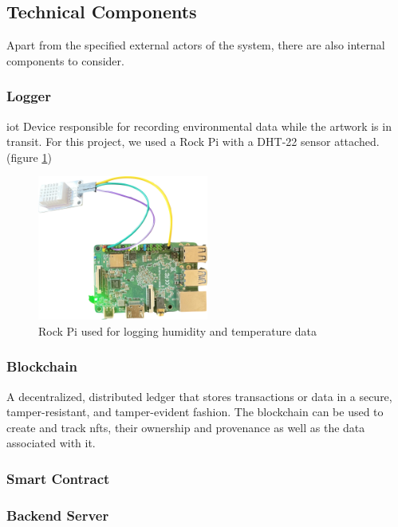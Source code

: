 \subsection{Technical Components}
Apart from the specified external actors of the system, there are also internal components to consider.

\subsubsection{Logger}
\gls{iot} Device responsible for recording environmental data while the artwork is in transit. For this project, we used a Rock Pi with a DHT-22 sensor attached. (figure \ref{fig:rock-pi})

\begin{figure}[H]
    \centering
    \includegraphics[width=0.5\textwidth]{resources/rock-pi.png}
    \caption{Rock Pi used for logging humidity and temperature data}
    \label{fig:rock-pi}
\end{figure}

\subsubsection{Blockchain}
A decentralized, distributed ledger that stores transactions or data in a secure, tamper-resistant, and tamper-evident fashion. The blockchain can be used to create and track \glspl{nft}, their ownership and provenance as well as the data associated with it.

\subsubsection{Smart Contract}

\subsubsection{Backend Server}
